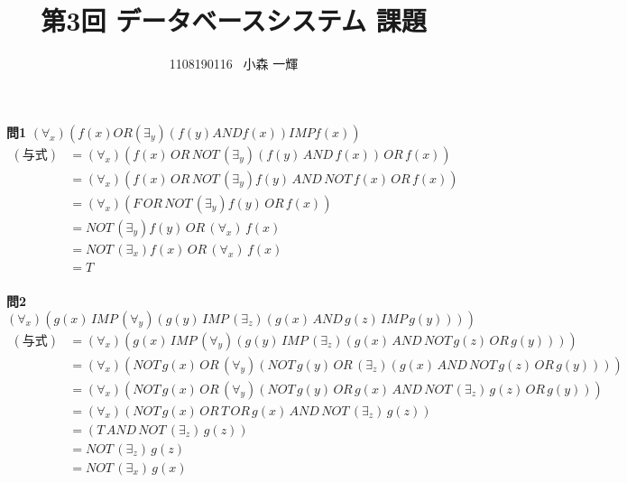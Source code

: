 \documentclass[dvipdfmx,10pt, a4j]{jarticle}
\title{第3回 データベースシステム 課題}
\author{1108190116 \, 小森 一輝}
\theoremstyle{definition}
\begin{document}
    \maketitle

    \setcounter{section}{2}
    \noindent
    \textbf{問1} $(\forall_x)(f(x)OR(\exists_y)(f(y) AND f(x)) IMP f(x))$ \\
    \begin{align*}
        (与式) &= (\forall_x)(f(x)\, OR\, NOT\, (\exists_y)(f(y)\, AND\, f(x))\, OR\, f(x))\\
        &= (\forall_x)(f(x)\,OR\,NOT\,(\exists_y)f(y)\,AND\,NOT\,f(x)\,OR\,f(x))\\
        &= (\forall_x)(F\, OR\, NOT\,(\exists_y)f(y)\,OR\,f(x))\\
        &= NOT\, (\exists_y)f(y)\, OR\, (\forall_x)\, f(x)\\
        &= NOT\, (\exists_x)f(x)\, OR\, (\forall_x)\, f(x)\\
        &= T\\
    \end{align*}

    \noindent
    \textbf{問2} $(\forall_x)(g(x)\, IMP \, (\forall_y)(g(y)\, IMP\, (\exists_z)(g(x)\, AND \, g(z)\, IMP\, g(y))))$ \\
    \begin{align*}
        (与式) &= (\forall_x)(g(x)\, IMP \, (\forall_y)(g(y)\, IMP\, (\exists_z)(g(x)\, AND\, NOT\, g(z)\, OR\, g(y))))\\
        &= (\forall_x)(NOT\, g(x)\, OR \, (\forall_y)(NOT\, g(y)\, OR\, (\exists_z)(g(x)\, AND\, NOT\, g(z)\, OR\, g(y))))\\
        &= (\forall_x)(NOT\, g(x)\, OR \, (\forall_y)(NOT\, g(y)\, OR\, g(x)\, AND\, NOT\, (\exists_z)\, g(z)\, OR\, g(y)))\\
        &= (\forall_x)(NOT\, g(x)\, OR\, T\, OR\, g(x)\, AND\, NOT\, (\exists_z)\, g(z))\\
        &= (T\, AND\, NOT\, (\exists_z)\, g(z))\\
        &= NOT\, (\exists_z)\, g(z)\\
        &= NOT\, (\exists_x)\, g(x)\\
    \end{align*}
\end{document}
